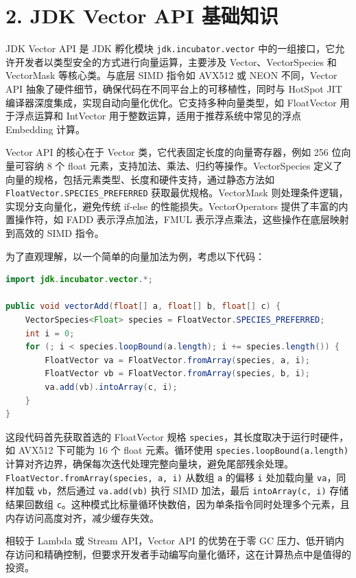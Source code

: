 \chapter{2. JDK Vector API 基础知识}
JDK Vector API 是 JDK 孵化模块 \texttt{jdk.incubator.vector} 中的一组接口，它允许开发者以类型安全的方式进行向量运算，主要涉及 Vector、VectorSpecies 和 VectorMask 等核心类。与底层 SIMD 指令如 AVX512 或 NEON 不同，Vector API 抽象了硬件细节，确保代码在不同平台上的可移植性，同时与 HotSpot JIT 编译器深度集成，实现自动向量化优化。它支持多种向量类型，如 FloatVector 用于浮点运算和 IntVector 用于整数运算，适用于推荐系统中常见的浮点 Embedding 计算。\par
Vector API 的核心在于 Vector 类，它代表固定长度的向量寄存器，例如 256 位向量可容纳 8 个 float 元素，支持加法、乘法、归约等操作。VectorSpecies 定义了向量的规格，包括元素类型、长度和硬件支持，通过静态方法如 \texttt{FloatVector.SPECIES\_{}PREFERRED} 获取最优规格。VectorMask 则处理条件逻辑，实现分支向量化，避免传统 if-else 的性能损失。VectorOperators 提供了丰富的内置操作符，如 FADD 表示浮点加法，FMUL 表示浮点乘法，这些操作在底层映射到高效的 SIMD 指令。\par
为了直观理解，以一个简单的向量加法为例，考虑以下代码：\par
\begin{lstlisting}[language=java]
import jdk.incubator.vector.*;

public void vectorAdd(float[] a, float[] b, float[] c) {
    VectorSpecies<Float> species = FloatVector.SPECIES_PREFERRED;
    int i = 0;
    for (; i < species.loopBound(a.length); i += species.length()) {
        FloatVector va = FloatVector.fromArray(species, a, i);
        FloatVector vb = FloatVector.fromArray(species, b, i);
        va.add(vb).intoArray(c, i);
    }
}
\end{lstlisting}
这段代码首先获取首选的 FloatVector 规格 \texttt{species}，其长度取决于运行时硬件，如 AVX512 下可能为 16 个 float 元素。循环使用 \texttt{species.loopBound(a.length)} 计算对齐边界，确保每次迭代处理完整向量块，避免尾部残余处理。\texttt{FloatVector.fromArray(species, a, i)} 从数组 \texttt{a} 的偏移 \texttt{i} 处加载向量 \texttt{va}，同样加载 \texttt{vb}，然后通过 \texttt{va.add(vb)} 执行 SIMD 加法，最后 \texttt{intoArray(c, i)} 存储结果回数组 \texttt{c}。这种模式比标量循环快数倍，因为单条指令同时处理多个元素，且内存访问高度对齐，减少缓存失效。\par
相较于 Lambda 或 Stream API，Vector API 的优势在于零 GC 压力、低开销内存访问和精确控制，但要求开发者手动编写向量化循环，这在计算热点中是值得的投资。\par
